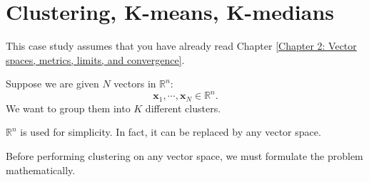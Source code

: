 \documentclass{huhtakm-template-book-v2}
\begin{document}
\appendix
\renewcommand{\thechapter}{\Alph{chapter}}
\chapter{Clustering, K-means, K-medians}
	\label{Case Study A: Clustering, K-means, K-medians}
	This case study assumes that you have already read Chapter \ref{Chapter 2: Vector spaces, metrics, limits, and convergence}.
	
    Suppose we are given $N$ vectors in $\mathbb{R}^{n}$:
    \begin{equation*}
        \mathbf{x}_{1}, \cdots, \mathbf{x}_{N} \in \mathbb{R}^{n}.
    \end{equation*}
    We want to group them into $K$ different clusters.
    \begin{rem}
        $\mathbb{R}^{n}$ is used for simplicity. In fact, it can be replaced by any vector space.
    \end{rem}
    Before performing clustering on any vector space, we must formulate the problem mathematically.
\end{document}
